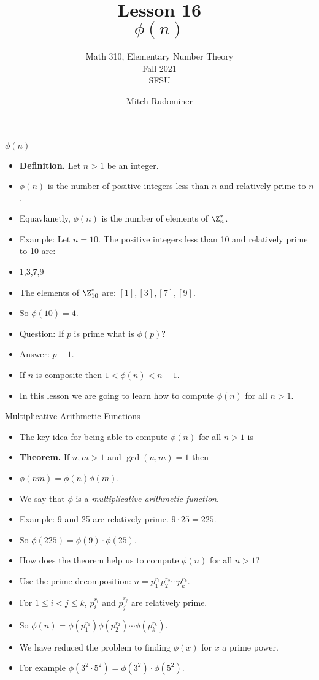 \documentclass[handout]{beamer}
\title{Lesson 16 \\ $\phi(n)$}
\subtitle{Math 310, Elementary Number Theory \\ Fall 2021 \\ SFSU}
\author{Mitch Rudominer}
\date{}
\begin{document}
\begin{frame}
  \titlepage
\end{frame}

\begin{frame}{$\phi(n)$}

\begin{itemize}
  \item \textbf{Definition.} Let $n>1$ be an integer.
  \item $\phi(n)$ is the number of positive integers less than $n$ and relatively prime to $n$.
  \item Equavlanetly, $\phi(n)$ is the number of elements of $\Z_n^*$.
  \item Example: Let $n=10$. The positive integers less than 10 and relatively prime to 10 are:
  \item 1,3,7,9
  \item The elements of $\Z_{10}^*$ are: $[1], [3], [7], [9]$.
  \item So $\phi(10) = 4$.
  \item Question: If $p$ is prime what is $\phi(p)$?
  \item Answer: $p-1$.
  \item If $n$ is composite then $1<\phi(n)<n-1$.
  \item In this lesson we are going to learn how to compute $\phi(n)$ for all $n>1$.
\end{itemize}

\end{frame}

\begin{frame}{Multiplicative Arithmetic Functions}

\begin{itemize}
  \item The key idea for being able to compute $\phi(n)$ for all $n>1$ is
  \item \textbf{Theorem.} If $n,m>1$ and $\gcd(n,m)=1$ then
  \item $\phi(nm) = \phi(n)\phi(m)$.
  \item We say that $\phi$ is a \emph{multiplicative arithmetic function}.
  \item Example: 9 and 25 are relatively prime. $9\cdot 25 = 225$.
  \item So $\phi(225) = \phi(9) \cdot \phi(25)$.
  \item How does the theorem help us to compute $\phi(n)$ for all $n>1$?
  \item Use the prime decomposition: $n=p_1^{r_1}p_2^{r_2}\cdots p_k^{r_k}$.
  \item For $1\leq i < j \leq k$, $p_i^{r_i}$ and $p_j^{r_j}$ are relatively prime.
  \item So  $\phi(n)=\phi(p_1^{r_1})\phi(p_2^{r_2})\cdots \phi(p_k^{r_k})$.
  \item We have reduced the problem to finding $\phi(x)$ for $x$ a prime power.
  \item For example $\phi(3^2\cdot 5^2) = \phi(3^2) \cdot \phi(5^2)$.
\end{itemize}

\end{frame}
\end{document}
